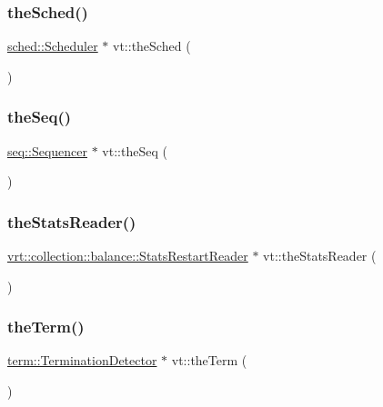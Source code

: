 \mbox{\label{namespacevt_a4508b38e6ab664b64f1415aecbb83571}} 
\subsubsection{\texorpdfstring{the\+Sched()}{theSched()}}
{\footnotesize\ttfamily \hyperlink{structvt_1_1sched_1_1_scheduler}{sched\+::\+Scheduler} $\ast$ vt\+::the\+Sched (\begin{DoxyParamCaption}{ }\end{DoxyParamCaption})}

\mbox{\label{namespacevt_a4a7d07c845b311da59286de486d623c7}} 
\subsubsection{\texorpdfstring{the\+Seq()}{theSeq()}}
{\footnotesize\ttfamily \hyperlink{structvt_1_1seq_1_1_sequencer}{seq\+::\+Sequencer} $\ast$ vt\+::the\+Seq (\begin{DoxyParamCaption}{ }\end{DoxyParamCaption})}

\mbox{\label{namespacevt_ad73860100c7d2ca1d833eab74942ee73}} 
\subsubsection{\texorpdfstring{the\+Stats\+Reader()}{theStatsReader()}}
{\footnotesize\ttfamily \hyperlink{structvt_1_1vrt_1_1collection_1_1balance_1_1_stats_restart_reader}{vrt\+::collection\+::balance\+::\+Stats\+Restart\+Reader} $\ast$ vt\+::the\+Stats\+Reader (\begin{DoxyParamCaption}{ }\end{DoxyParamCaption})}

\mbox{\label{namespacevt_a127580fdfcaba0b4171e5c48c5676733}} 
\subsubsection{\texorpdfstring{the\+Term()}{theTerm()}}
{\footnotesize\ttfamily \hyperlink{structvt_1_1term_1_1_termination_detector}{term\+::\+Termination\+Detector} $\ast$ vt\+::the\+Term (\begin{DoxyParamCaption}{ }\end{DoxyParamCaption})}

